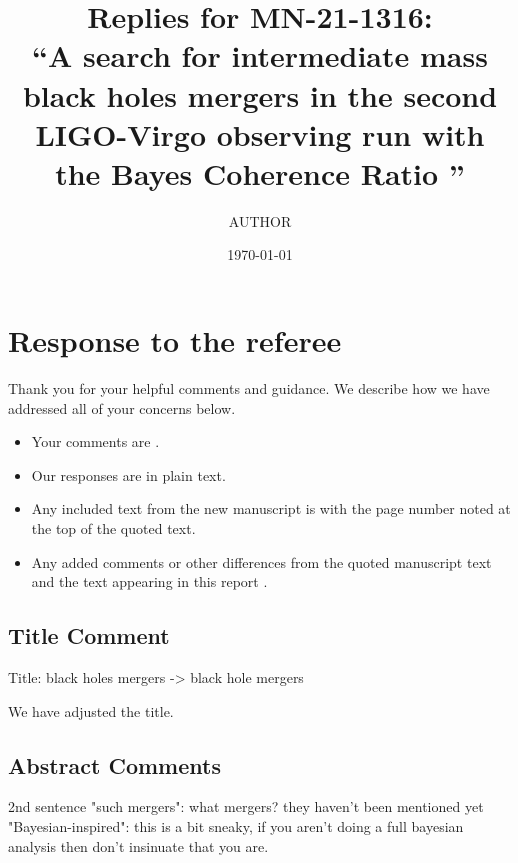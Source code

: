 \documentclass[11pt,leqno]{article}
\title{Replies for MN-21-1316:\\
 ``A search for intermediate mass black holes mergers in the second LIGO-Virgo observing run with the Bayes Coherence Ratio
''}
\author{AUTHOR}
\date{\today}
\begin{document}
\onehalfspacing


\section*{Response to the referee}
Thank you for your helpful comments and guidance. We describe how we have addressed all of your concerns below. \\
\begin{itemize}
    \item Your comments are . 
    \item Our responses are in plain text. 
    \item Any included text from the new manuscript is  with the page number noted at the top of the quoted text. 
    \item Any added comments or other differences from the quoted manuscript text and the text appearing in this report {\color{red} {}}. 
\end{itemize}


\subsection*{Title Comment} 
\begin{tcolorbox}[left = 1em, top = 1ex, bottom = 1ex, colupper=black, colback=black!10, adjusted title =  Comment 1]
    \setlength\parindent{2em}
	\noindent
	\ttfamily
	Title: black holes mergers -> black hole mergers
\end{tcolorbox}
We have adjusted the title.


\subsection*{Abstract Comments} 
\begin{tcolorbox}[left = 1em, top = 1ex, bottom = 1ex, colupper=black, colback=black!10, adjusted title = Comment 1]
    \setlength\parindent{2em}
	\noindent
	\ttfamily
	2nd sentence "such mergers": what mergers? they haven't been mentioned yet "Bayesian-inspired": this is a bit sneaky, if you aren't doing a full bayesian analysis then don't insinuate that you are.
\end{tcolorbox}

\end{document}
